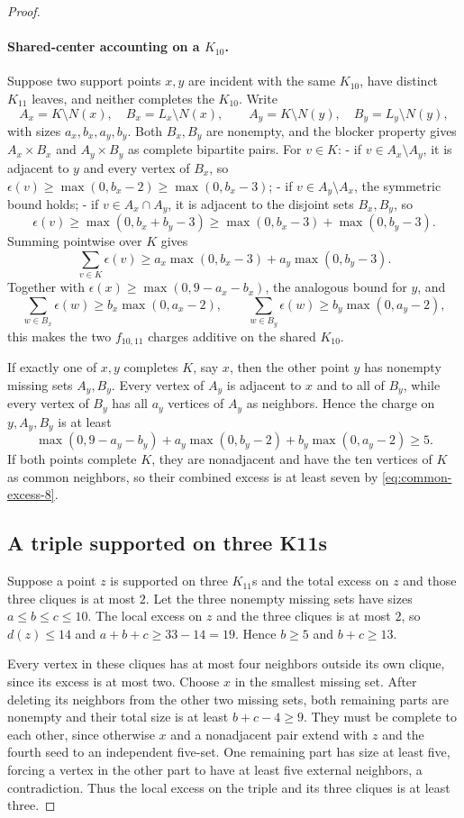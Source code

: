 \begin{proof}
\paragraph{Shared-center accounting on a $K_{10}$.}
Suppose two support points $x,y$ are incident with the same $K_{10}$, have distinct $K_{11}$ leaves, and neither completes the $K_{10}$. Write
\[
A_x=K\setminus N(x),\quad B_x=L_x\setminus N(x),\qquad
A_y=K\setminus N(y),\quad B_y=L_y\setminus N(y),
\]
with sizes $a_x,b_x,a_y,b_y$. Both $B_x,B_y$ are nonempty, and the blocker property gives $A_x\times B_x$ and $A_y\times B_y$ as complete bipartite pairs. For $v\in K$:
- if $v\in A_x\setminus A_y$, it is adjacent to $y$ and every vertex of $B_x$, so $\epsilon(v)\geq\max(0,b_x-2)\geq\max(0,b_x-3)$;
- if $v\in A_y\setminus A_x$, the symmetric bound holds;
- if $v\in A_x\cap A_y$, it is adjacent to the disjoint sets $B_x,B_y$, so
\[
\epsilon(v)\geq\max(0,b_x+b_y-3)
\geq\max(0,b_x-3)+\max(0,b_y-3).
\]
Summing pointwise over $K$ gives
\[
\sum_{v\in K}\epsilon(v)\geq
a_x\max(0,b_x-3)+a_y\max(0,b_y-3).
\]
Together with $\epsilon(x)\geq\max(0,9-a_x-b_x)$, the analogous bound for $y$, and
\[
\sum_{w\in B_x}\epsilon(w)\geq b_x\max(0,a_x-2),\qquad
\sum_{w\in B_y}\epsilon(w)\geq b_y\max(0,a_y-2),
\]
this makes the two $f_{10,11}$ charges additive on the shared $K_{10}$.

If exactly one of $x,y$ completes $K$, say $x$, then the other point $y$ has nonempty missing sets $A_y,B_y$. Every vertex of $A_y$ is adjacent to $x$ and to all of $B_y$, while every vertex of $B_y$ has all $a_y$ vertices of $A_y$ as neighbors. Hence the charge on $y,A_y,B_y$ is at least
\[
\max(0,9-a_y-b_y)+a_y\max(0,b_y-2)+b_y\max(0,a_y-2)\geq5.
\]
If both points complete $K$, they are nonadjacent and have the ten vertices of $K$ as common neighbors, so their combined excess is at least seven by \eqref{eq:common-excess-8}.

\subsection*{A triple supported on three K11s}

Suppose a point $z$ is supported on three $K_{11}$s and the total excess on $z$ and those three cliques is at most $2$. Let the three nonempty missing sets have sizes $a\leq b\leq c\leq10$. The local excess on $z$ and the three cliques is at most $2$, so $d(z)\leq14$ and $a+b+c\geq33-14=19$. Hence $b\geq5$ and $b+c\geq13$.

Every vertex in these cliques has at most four neighbors outside its own clique, since its excess is at most two. Choose $x$ in the smallest missing set. After deleting its neighbors from the other two missing sets, both remaining parts are nonempty and their total size is at least $b+c-4\geq9$. They must be complete to each other, since otherwise $x$ and a nonadjacent pair extend with $z$ and the fourth seed to an independent five-set. One remaining part has size at least five, forcing a vertex in the other part to have at least five external neighbors, a contradiction. Thus the local excess on the triple and its three cliques is at least three.


\end{proof}
